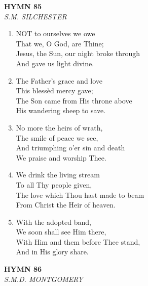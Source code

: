 \documentclass[11pt,a4paper]{article}
\begin{document}
\newpage
\begin{center}
    {\Large \textbf{HYMN 85}}
    \\
    \textit{S.M. SILCHESTER}
\end{center}
\vspace{1em}

\begin{enumerate}
    \item NOT to ourselves we owe \\
        That we, O God, are Thine; \\
        Jesus, the Sun, our night broke through \\
        And gave us light divine.

    \item The Father's grace and love \\
        This bless\`ed mercy gave; \\
        The Son came from His throne above \\
        His wandering sheep to save.

    \item No more the heirs of wrath, \\
        The smile of peace we see, \\
        And triumphing o'er sin and death \\
        We praise and worship Thee.

    \item We drink the living stream \\
        To all Thy people given, \\
        The love which Thou hast made to beam \\
        From Christ the Heir of heaven.

    \item With the adopted band, \\
        We soon shall see Him there, \\
        With Him and them before Thee stand, \\
        And in His glory share.

\end{enumerate}

\newpage
\begin{center}
    {\Large \textbf{HYMN 86}}
    \\
    \textit{S.M.D. MONTGOMERY}
\end{center}
\vspace{1em}
\end{document}
